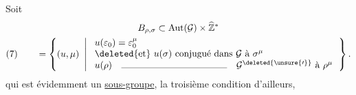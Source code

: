 Soit
\[
\begin{gathered}
B_{\rho,\sigma}\subset\operatorname{Aut}(\mathcal{G})\times\widehat{\mathbb Z}^{*}
\\
(7)\qquad =\left\{(u,\mu)\ \left|\
\begin{array}{l}
u(\varepsilon_0)=\varepsilon_0^\mu\\
\deleted{\text{et}}\ u(\sigma)\ \text{conjugué dans }\mathcal{G}\text{ à }\sigma^\mu\\
u(\rho)\quad\rule{4cm}{0.3pt}\quad
\mathcal{G}^{\deleted{\unsure{\prime}}}\text{ à }\rho^\mu
\end{array}\right.\right\}.
\end{gathered}
\]
qui est évidemment un \uline{sous-groupe},
la troisième condition  d'ailleurs,


